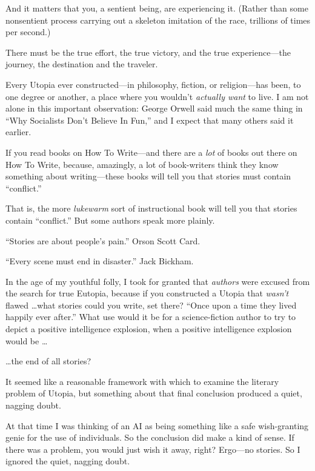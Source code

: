 {
 And it matters that you, a sentient being, are experiencing it.
(Rather than some nonsentient process carrying out a skeleton imitation
of the race, trillions of times per second.)}

{
 There must be the true effort, the true victory, and the true
experience---the journey, the destination and the traveler.}

\myendsectiontext


{
 Every Utopia ever constructed---in philosophy, fiction, or
religion---has been, to one degree or another, a place where you
wouldn't \textit{actually want} to live. I am not alone
in this important observation: George Orwell said much the same thing
in ``Why Socialists Don't Believe In
Fun,'' and I expect that many others said it earlier.
}

{
 If you read books on How To Write---and there are a \textit{lot}
of books out there on How To Write, because, amazingly, a lot of
book-writers think they know something about writing---these books will
tell you that stories must contain
``conflict.''}

{
 That is, the more \textit{lukewarm} sort of instructional book
will tell you that stories contain
``conflict.'' But some authors speak
more plainly.}

{
 ``Stories are about people's
pain.'' Orson Scott Card.}

{
 ``Every scene must end in
disaster.'' Jack Bickham.}

{
 In the age of my youthful folly, I took for granted that
\textit{authors} were excused from the search for true Eutopia, because
if you constructed a Utopia that \textit{wasn't} flawed
\ldots what stories could you write, set there? ``Once
upon a time they lived happily ever after.'' What use
would it be for a science-fiction author to try to depict a positive
intelligence explosion, when a positive intelligence explosion would be
\ldots}

{
 \ldots the end of all stories?}

{
 It seemed like a reasonable framework with which to examine the
literary problem of Utopia, but something about that final conclusion
produced a quiet, nagging doubt.}

{
 At that time I was thinking of an AI as being something like a
safe wish-granting genie for the use of individuals. So the conclusion
did make a kind of sense. If there was a problem, you would just wish
it away, right? Ergo---no stories. So I ignored the quiet, nagging
doubt.}

